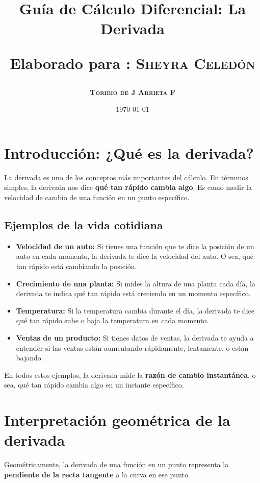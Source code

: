 \documentclass[12pt,a4paper]{article}
\title{\Large Guía de Cálculo Diferencial: La Derivada

\small{Elaborado para : \textsc{\bf{Sheyra Celedón}}}}
\author{\bf{\textsc{Toribio de J Arrieta F}}}
\date{\today}
\begin{document}
\maketitle

\section*{Introducción: ¿Qué es la derivada?}

La derivada es uno de los conceptos más importantes del cálculo. En términos simples, la derivada nos dice \textbf{qué tan rápido cambia algo}. Es como medir la velocidad de cambio de una función en un punto específico.

\subsection*{Ejemplos de la vida cotidiana}

\begin{itemize}
	\item \textbf{Velocidad de un auto:} Si tienes una función que te dice la posición de un auto en cada momento, la derivada te dice la velocidad del auto. O sea, qué tan rápido está cambiando la posición.

	\item \textbf{Crecimiento de una planta:} Si mides la altura de una planta cada día, la derivada te indica qué tan rápido está creciendo en un momento específico.

	\item \textbf{Temperatura:} Si la temperatura cambia durante el día, la derivada te dice qué tan rápido sube o baja la temperatura en cada momento.

	\item \textbf{Ventas de un producto:} Si tienes datos de ventas, la derivada te ayuda a entender si las ventas están aumentando rápidamente, lentamente, o están bajando.
\end{itemize}

En todos estos ejemplos, la derivada mide la \textbf{razón de cambio instantánea}, o sea, qué tan rápido cambia algo en un instante específico.

\section{Interpretación geométrica de la derivada}

Geométricamente, la derivada de una función en un punto representa la \textbf{pendiente de la recta tangente} a la curva en ese punto.
\end{document}
